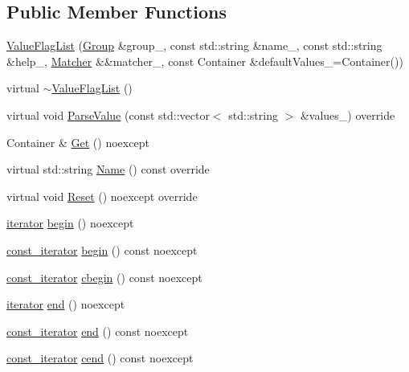 \subsection*{Public Member Functions}
\begin{DoxyCompactItemize}
\item 
\hyperlink{classargs_1_1_value_flag_list_a8f07c17af44a077028bb71a6ac5b1660}{Value\+Flag\+List} (\hyperlink{classargs_1_1_group}{Group} \&group\+\_\+, const std\+::string \&name\+\_\+, const std\+::string \&help\+\_\+, \hyperlink{classargs_1_1_matcher}{Matcher} \&\&matcher\+\_\+, const Container \&default\+Values\+\_\+=Container())
\item 
virtual \hyperlink{classargs_1_1_value_flag_list_a5d3c39a9b0f36c94938760d4f93d5949}{$\sim$\+Value\+Flag\+List} ()
\item 
virtual void \hyperlink{classargs_1_1_value_flag_list_afbd3d460a8cee4c84d0a6210de068f83}{Parse\+Value} (const std\+::vector$<$ std\+::string $>$ \&values\+\_\+) override
\item 
Container \& \hyperlink{classargs_1_1_value_flag_list_a5901ba26d5e4f78732e1474fe8780950}{Get} () noexcept
\item 
virtual std\+::string \hyperlink{classargs_1_1_value_flag_list_ac0188f5bbc605c02edce2a91675d423c}{Name} () const override
\item 
virtual void \hyperlink{classargs_1_1_value_flag_list_aa28bb85e0c850c0959b2387bdebd7b8f}{Reset} () noexcept override
\item 
\hyperlink{classargs_1_1_value_flag_list_a4374b7a70c21c42d72912ec5ce323515}{iterator} \hyperlink{classargs_1_1_value_flag_list_a44d5f3380abe2ac5033c437042a69970}{begin} () noexcept
\item 
\hyperlink{classargs_1_1_value_flag_list_afc267bd3d85ff266eccf4b66cea4a274}{const\+\_\+iterator} \hyperlink{classargs_1_1_value_flag_list_aaea6a38680e01450b11341439178cdb4}{begin} () const noexcept
\item 
\hyperlink{classargs_1_1_value_flag_list_afc267bd3d85ff266eccf4b66cea4a274}{const\+\_\+iterator} \hyperlink{classargs_1_1_value_flag_list_aac43394cc9d6d720ea34406985b2ca31}{cbegin} () const noexcept
\item 
\hyperlink{classargs_1_1_value_flag_list_a4374b7a70c21c42d72912ec5ce323515}{iterator} \hyperlink{classargs_1_1_value_flag_list_a85588944b3b2240d09e21e3df66c6ab0}{end} () noexcept
\item 
\hyperlink{classargs_1_1_value_flag_list_afc267bd3d85ff266eccf4b66cea4a274}{const\+\_\+iterator} \hyperlink{classargs_1_1_value_flag_list_a5bc842210d8e06e5150d15fcfc2cbc5a}{end} () const noexcept
\item 
\hyperlink{classargs_1_1_value_flag_list_afc267bd3d85ff266eccf4b66cea4a274}{const\+\_\+iterator} \hyperlink{classargs_1_1_value_flag_list_aaa2f211b8519092dfc4c90a4a664b540}{cend} () const noexcept
\end{DoxyCompactItemize}
